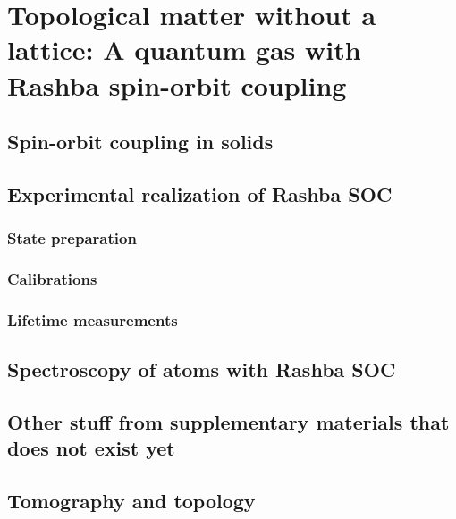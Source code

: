 
\renewcommand{\thechapter}{8}

\chapter{Topological matter without a lattice: A quantum gas with Rashba spin-orbit coupling}



\section{Spin-orbit coupling in solids}
\section{Experimental realization of Rashba SOC }
\subsection{State preparation}
\subsection{Calibrations}
\subsection{Lifetime measurements}
\section{Spectroscopy of atoms with Rashba SOC}
\section{Other stuff from supplementary materials that does not exist yet}
\section{Tomography and topology}
